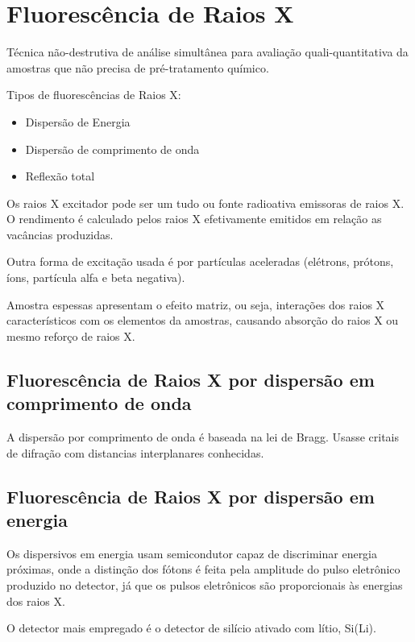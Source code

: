 \section{Fluorescência de Raios X}

Técnica não-destrutiva de análise simultânea para avaliação 
quali-quantitativa da amostras que não precisa de pré-tratamento químico. 

Tipos de fluorescências de Raios X:
\begin{itemize}
  \item Dispersão de Energia
  \item Dispersão de comprimento de onda
  \item Reflexão total
\end{itemize}

Os raios X excitador pode ser um tudo ou fonte radioativa emissoras de raios X.
O rendimento é calculado pelos raios X efetivamente emitidos em 
relação as vacâncias produzidas.

Outra forma de excitação usada é por partículas aceleradas 
(elétrons, prótons, íons, partícula alfa e beta negativa).

Amostra espessas apresentam o efeito matriz, ou seja, interações dos 
raios X característicos com os elementos da amostras, causando 
absorção do raios X ou mesmo reforço de raios X.

\subsection{Fluorescência de Raios X por dispersão em comprimento de onda}

A dispersão por comprimento de onda é baseada na lei de Bragg.
Usasse critais de difração com distancias interplanares conhecidas.
  

\subsection{Fluorescência de Raios X por dispersão em energia}

Os dispersivos em energia usam semicondutor capaz de discriminar energia 
próximas, onde a distinção dos fótons é feita pela amplitude do pulso 
eletrônico produzido no detector, já que os pulsos eletrônicos são
proporcionais às energias dos raios X. 

O detector mais empregado é o detector de silício ativado com lítio, Si(Li).

